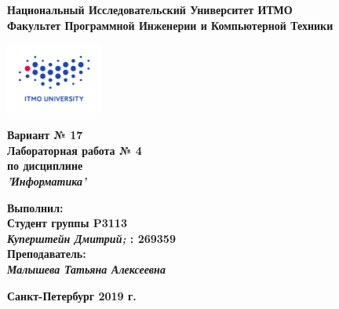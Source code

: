 \documentclass[11pt]{article}
\author{АВТОР}
\date{\today}
\title{}
\begin{document}
\thispagestyle{empty}
\begin{center}
\textbf{Национальный Исследовательский Университет ИТМО}\\
\textbf{Факультет Программной Инженерии и Компьютерной Техники}\\
\end{center}
\vspace{2em}
\begin{center}
\includegraphics[width=120px]{../../../itmo-logo.png}
\end{center}
\LARGE
\vspace{5em}
\begin{center}
\textbf{Вариант № 17}\\
\textbf{Лабораторная работа № 4}\\
\Large
\textbf{по дисциплине}\\
\LARGE
\textbf{\emph{'Информатика'}}\\
\end{center}
\vspace{11em}
\large
\begin{flushright}
\textbf{Выполнил:}\\
\textbf{Студент группы P3113}\\
\textbf{\emph{Куперштейн Дмитрий;} : 269359}\\
\textbf{Преподаватель:}\\
\textbf{\emph{Малышева Татьяна Алексеевна}}\\
\end{flushright}
\vspace{4em}
\large
\begin{center}
\textbf{Санкт-Петербург 2019 г.}
\end{center}
\pagebreak{}
\setcounter{tocdepth}{2}
\tableofcontents
\vspace{2em}
\pagebreak
\large
\end{document}
